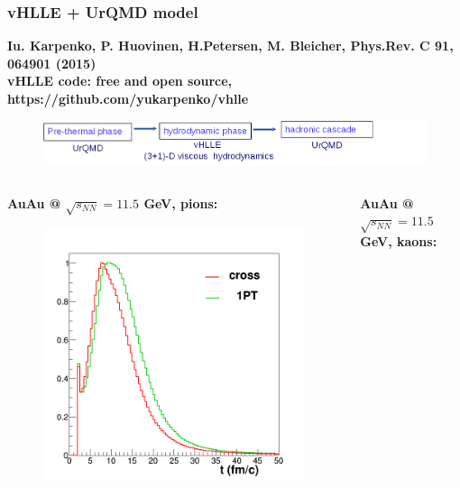 \documentclass[dvipsnames] {beamer}
\begin{document}
\begin{frame}[shrink=20]
  \frametitle{vHLLE + UrQMD model}
  \begin{block}{{ \bf {\footnotesize Iu. Karpenko, P. Huovinen, H.Petersen, M. Bleicher, Phys.Rev. C 91, 064901 (2015)} \\
    vHLLE code: free and open source, https://github.com/yukarpenko/vhlle}}
    \begin{figure}[H]
      \includegraphics[width=1.\linewidth]{vHLLE.png}
    \end{figure}
  \end{block}
  \begin{columns}[c]
        \begin{block}{\bf \centering AuAu @ $\sqrt{s_{NN}} = 11.5$ GeV, pions:}
        \begin{figure}[H]
          \includegraphics[width=.95\linewidth]{time_11GeV_pions.png}
        \end{figure}
     \end{block}
         \begin{block}{\bf \centering AuAu @ $\sqrt{s_{NN}} = 11.5$ GeV, kaons:}
        \begin{figure}[H]

\end{figure}
\end{block}
\end{columns}
\end{frame}
\end{document}
